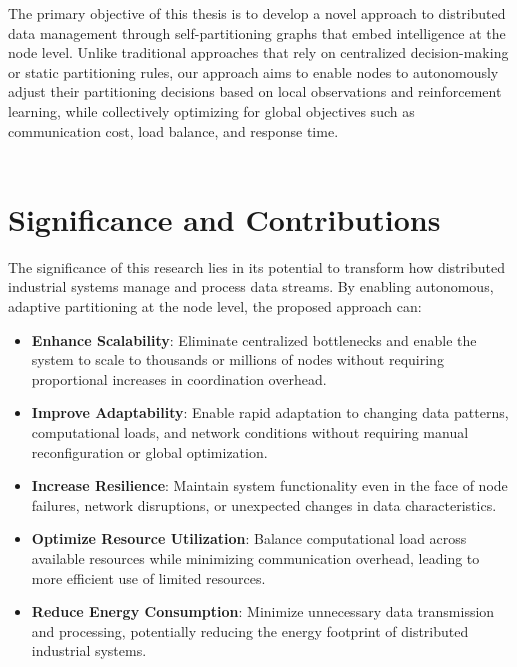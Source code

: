 \documentclass{article}
\begin{document}
The primary objective of this thesis is to develop a novel approach to distributed data management through self-partitioning graphs that embed intelligence at the node level. Unlike traditional approaches that rely on centralized decision-making or static partitioning rules, our approach aims to enable nodes to autonomously adjust their partitioning decisions based on local observations and reinforcement learning, while collectively optimizing for global objectives such as communication cost, load balance, and response time.\\
\\


\section{Significance and Contributions}

The significance of this research lies in its potential to transform how distributed industrial systems manage and process data streams. By enabling autonomous, adaptive partitioning at the node level, the proposed approach can:

\begin{itemize}
    \item \textbf{Enhance Scalability}: Eliminate centralized bottlenecks and enable the system to scale to thousands or millions of nodes without requiring proportional increases in coordination overhead.
    
    \item \textbf{Improve Adaptability}: Enable rapid adaptation to changing data patterns, computational loads, and network conditions without requiring manual reconfiguration or global optimization.
    
    \item \textbf{Increase Resilience}: Maintain system functionality even in the face of node failures, network disruptions, or unexpected changes in data characteristics.
    
    \item \textbf{Optimize Resource Utilization}: Balance computational load across available resources while minimizing communication overhead, leading to more efficient use of limited resources.
    
    \item \textbf{Reduce Energy Consumption}: Minimize unnecessary data transmission and processing, potentially reducing the energy footprint of distributed industrial systems.
\end{itemize}
\end{document}
